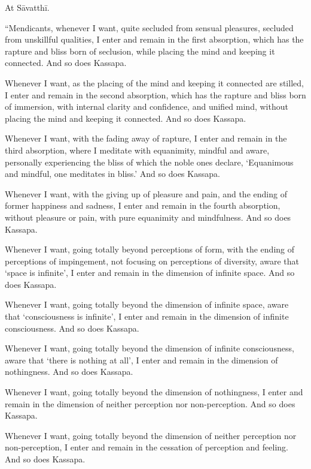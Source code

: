 \documentclass[12pt,openany]{book}%
\begin{document}
At \textsanskrit{Sāvatthī}. 

“Mendicants, whenever I want, quite secluded from sensual pleasures, secluded from unskillful qualities, I enter and remain in the first absorption, which has the rapture and bliss born of seclusion, while placing the mind and keeping it connected. And so does Kassapa. 

Whenever I want, as the placing of the mind and keeping it connected are stilled, I enter and remain in the second absorption, which has the rapture and bliss born of immersion, with internal clarity and confidence, and unified mind, without placing the mind and keeping it connected. And so does Kassapa. 

Whenever I want, with the fading away of rapture, I enter and remain in the third absorption, where I meditate with equanimity, mindful and aware, personally experiencing the bliss of which the noble ones declare, ‘Equanimous and mindful, one meditates in bliss.’ And so does Kassapa. 

Whenever I want, with the giving up of pleasure and pain, and the ending of former happiness and sadness, I enter and remain in the fourth absorption, without pleasure or pain, with pure equanimity and mindfulness. And so does Kassapa. 

Whenever I want, going totally beyond perceptions of form, with the ending of perceptions of impingement, not focusing on perceptions of diversity, aware that ‘space is infinite’, I enter and remain in the dimension of infinite space. And so does Kassapa. 

Whenever I want, going totally beyond the dimension of infinite space, aware that ‘consciousness is infinite’, I enter and remain in the dimension of infinite consciousness. And so does Kassapa. 

Whenever I want, going totally beyond the dimension of infinite consciousness, aware that ‘there is nothing at all’, I enter and remain in the dimension of nothingness. And so does Kassapa. 

Whenever I want, going totally beyond the dimension of nothingness, I enter and remain in the dimension of neither perception nor non-perception. And so does Kassapa. 

Whenever I want, going totally beyond the dimension of neither perception nor non-perception, I enter and remain in the cessation of perception and feeling. And so does Kassapa. 
\end{document}
